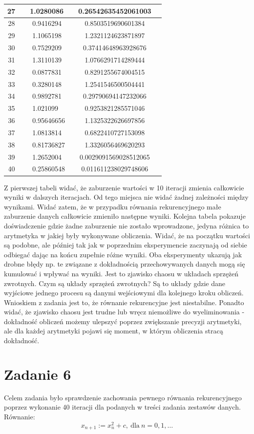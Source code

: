 \documentclass[]{article}
\begin{document}
\begin{table}[!h]
\begin{tabular}{|c|c|c|c|}
			27 & 1.0280086  		& 0.26542635452061003 \\ \hline
			28 & 0.9416294  		& 0.8503519690601384 \\ \hline
			29 & 1.1065198  		& 1.2321124623871897 \\ \hline
			30 & 0.7529209  		& 0.37414648963928676 \\ \hline
			31 & 1.3110139  		& 1.0766291714289444 \\ \hline
			32 & 0.0877831  		& 0.8291255674004515 \\ \hline
			33 & 0.3280148  		& 1.2541546500504441 \\ \hline
			34 & 0.9892781  		& 0.29790694147232066 \\ \hline
			35 & 1.021099   		& 0.9253821285571046 \\ \hline
			36 & 0.95646656 		& 1.1325322626697856 \\ \hline
			37 & 1.0813814  		& 0.6822410727153098 \\ \hline
			38 & 0.81736827 		& 1.3326056469620293 \\ \hline
			39 & 1.2652004  		& 0.0029091569028512065 \\ \hline
			40 & 0.25860548 		& 0.011611238029748606 \\ \hline
		\end{tabular}
	\end{table}

	Z pierwszej tabeli widać, że zaburzenie wartości w 10 iteracji zmienia całkowicie wyniki w dalszych iteracjach. Od tego miejsca nie widać żadnej zależności między wynikami. Widać zatem, że w przypadku równania rekurencyjnego małe zaburzenie danych całkowicie zmieniło następne wyniki. Kolejna tabela pokazuje doświadczenie gdzie żadne zaburzenie nie zostało wprowadzone, jedyna różnica to arytmetyka w jakiej były wykonywane obliczenia. Widać, że na początku wartości są podobne, ale później tak jak w poprzednim eksperymencie zaczynają od siebie odbiegać dając na końcu zupełnie różne wyniki. Oba eksperymenty ukazują jak drobne błędy np. te związane z dokładnością przechowywanych danych mogą się kumulować i wpływać na wyniki. 
	Jest to zjawisko chaosu w układach sprzężeń zwrotnych. Czym są układy sprzężeń zwrotnych? Są to układy gdzie dane wyjściowe jednego procesu są danymi wejściowymi dla kolejnego kroku obliczeń. Wnioskiem z zadania jest to, że równanie rekurencyjne jest niestabilne. Ponadto widać, że zjawisko chaosu jest trudne lub wręcz niemożliwe do wyeliminowania - dokładność obliczeń możemy ulepszyć poprzez zwiększanie precyzji arytmetyki, ale dla każdej arytmetyki pojawi się moment, w którym obliczenia stracą dokładność. 
	
	\section*{Zadanie 6}
	
	Celem zadania było sprawdzenie zachowania pewnego równania rekurencyjnego poprzez wykonanie 40 iteracji dla podanych w treści zadania zestawów danych. Równanie:
	$$x_{n+1} := x^2_n + c, \ \textrm{dla} \ n = 0,1,\dots$$
	
	
	
	
\end{document}
